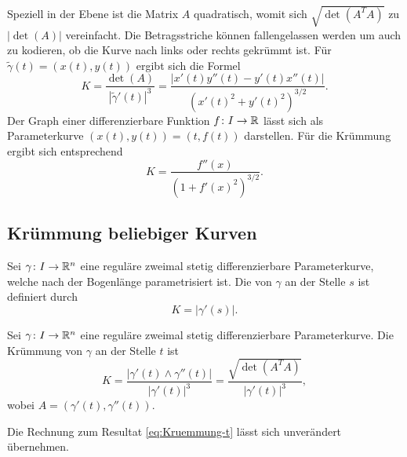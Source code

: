 Speziell in der Ebene ist die
Matrix $A$ quadratisch, womit sich $\sqrt{\det(A^T A)}$
zu $|\det(A)|$ vereinfacht. Die Betragsstriche können fallengelassen
werden um auch zu kodieren, ob die Kurve nach links oder rechts
gekrümmt ist. Für $\tilde\gamma(t)=(x(t),y(t))$ ergibt
sich die Formel%
\begin{equation}
K = \frac{\det(A)}{|\tilde\gamma'(t)|^3}
= \frac{|x'(t)y''(t)-y'(t)x''(t)|}{(x'(t)^2+y'(t)^2)^{3/2}}.
\end{equation}
Der Graph einer differenzierbare Funktion $f\colon I\to \mathbb R$ lässt sich
als Parameterkurve $(x(t),y(t))=(t,f(t))$ darstellen. Für die
Krümmung ergibt sich entsprechend
\begin{equation}
K = \frac{f''(x)}{(1+f'(x)^2)^{3/2}}.
\end{equation}

\subsection{Krümmung beliebiger Kurven}

\begin{definition}
Sei $\gamma\colon I\to \mathbb R^n$ eine reguläre zweimal stetig
differenzierbare Parameterkurve, welche nach der Bogenlänge
parametrisiert ist. Die  von $\gamma$ an der Stelle
$s$ ist definiert durch%
\begin{equation}
K = |\gamma'(s)|.
\end{equation}
\end{definition}

\begin{theorem}
Sei $\gamma\colon I\to\mathbb R^n$ eine reguläre zweimal stetig
differenzierbare Parameterkurve. Die Krümmung von $\gamma$ an der
Stelle $t$ ist%
\begin{equation}
K = \frac{|\gamma'(t)\wedge\gamma''(t)|}{|\gamma'(t)|^3}
= \frac{\sqrt{\det(A^T A)}}{|\gamma'(t)|^3},
\end{equation}
wobei $A=(\gamma'(t),\gamma''(t))$.
\end{theorem}
 Die Rechnung zum Resultat \eqref{eq:Kruemmung-t}
lässt sich unverändert übernehmen.\;\qedsymbol
